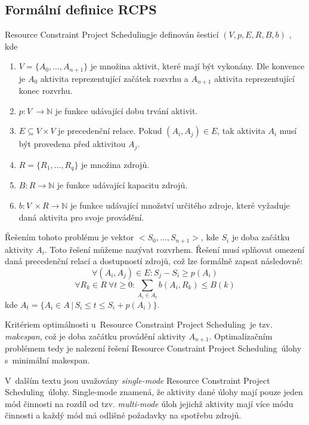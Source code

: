 \documentclass[a4paper, 12pt]{article}
\newcommand{\rcps}[0]{Resource Constraint Project Scheduling}
\begin{document}
\subsection{Formální definice RCPS}
\rcps je definován šesticí $(V, p, E, R, B, b)$ \cite{artigues:2007}, kde
\begin{enumerate}
    \item $V=\{A_0, \ldots, A_{n+1}\}$ je množina aktivit, které mají být vykonány.
    Dle konvence je $A_0$ aktivita reprezentující začátek rozvrhu a $A_{n+1}$ aktivita reprezentující konec rozvrhu.
    \item $p: V~\rightarrow \mathbb{N}$ je funkce udávající dobu trvání aktivit.
    \item $E \subseteq V\times V$ je precedenční relace.
    Pokud $(A_i, A_j) \in E$, tak aktivita $A_i$ musí být provedena před aktivitou $A_j$.
    \item $R=\{R_1,\ldots,R_q\}$ je množina zdrojů.
    \item $B: R \rightarrow \mathbb{N}$ je funkce udávající kapacitu zdrojů.
    \item $b: V~\times R \rightarrow \mathbb{N}$ je funkce udávající množství určitého zdroje, které vyžaduje daná aktivita pro
    svoje provádění.
\end{enumerate}

Řešením tohoto problému je vektor $<S_0,\ldots,S_{n+1}>$, kde $S_i$ je doba začátku aktivity $A_i$.
Toto řešení můžeme nazývat rozvrhem.
Řešení musí splňovat omezení daná precedenční relací a dostupností zdrojů, což lze formálně zapsat následovně:
\begin{equation}
 \forall (A_i,A_j) \in E: S_j - S_i \geq p(A_i)
\end{equation}
\begin{equation}
 \forall R_k \in R\ \forall t \geq 0: \sum_{A_i \in A_t} b(A_i, R_k) \leq B(k)
\end{equation}
kde $A_t=\{A_i \in A\,|\, S_i \leq t \leq S_i+p(A_i)\}$.

Kritériem optimálnosti u~\rcps\ je tzv. \emph{makespan}, což je doba začátku provádění aktivity $A_{n+1}$.
Optimalizačním problémem tedy je nalezení řešení \rcps\ úlohy s~minimální makespan.

V~dalším textu jsou uvažovány \emph{single-mode} \rcps\ úlohy.
Single-mode znamená, že aktivity dané úlohy mají pouze jeden mód činnosti
na rozdíl od tzv. \emph{multi-mode} úloh jejichž aktivity mají více módu činnosti
a každý mód má odlišné požadavky na spotřebu zdrojů.
\end{document}
